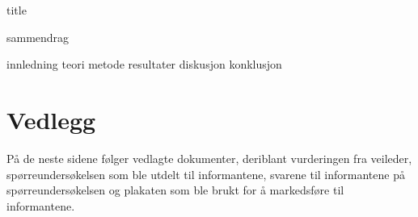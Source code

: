



{title}
\newpage

\cleardoublepage
\tableofcontents
\newpage

{sammendrag}


{innledning}
{teori}
{metode}
{resultater}
{diskusjon}
{konklusjon}

\newpage

\printbibliography[heading=bibintoc]
\newpage

\listoffigures

\section*{Vedlegg}\label{vedlegg}
På de neste sidene følger vedlagte dokumenter, deriblant vurderingen fra veileder, spørreundersøkelsen som ble utdelt til informantene, svarene til informantene på spørreundersøkelsen og plakaten som ble brukt for å markedsføre til informantene.
\newpage

{}

{}

{}

{}




